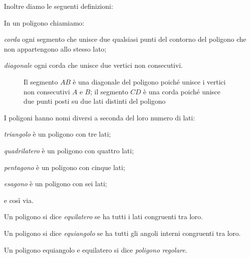 Inoltre diamo le seguenti definizioni:
\begin{definizione}
In un poligono chiamiamo:
\begin{itemize*}
\item \emph{corda} ogni segmento che unisce due qualsiasi punti del 
contorno del poligono che non appartengono allo stesso lato;
\item \emph{diagonale} ogni corda che unisce due vertici non 
consecutivi.
\end{itemize*}
\end{definizione}


\begin{inaccessibleblock}
 \begin{figure}[htb]
\centering
\caption{Il segmento \(AB\) è una diagonale del poligono poiché unisce 
i vertici non consecutivi \(A\) e \(B\); il segmento \(CD\) è una corda 
poiché unisce due punti posti su due lati distinti del poligono}
\end{figure}
\end{inaccessibleblock}

I poligoni hanno nomi diversi a seconda del loro numero di lati:
\begin{itemize*}
\item \emph{triangolo} è un poligono con tre lati;
\item \emph{quadrilatero} è un poligono con quattro lati;
\item \emph{pentagono} è un poligono con cinque lati;
\item \emph{esagono} è un poligono con sei lati;
\item e così via.
\end{itemize*}

\begin{definizione}
Un poligono si dice \emph{equilatero} se ha tutti i lati congruenti 
tra loro.
\end{definizione}

\begin{definizione}
Un poligono si dice \emph{equiangolo} se ha tutti gli angoli interni 
congruenti tra loro.
\end{definizione}

\begin{definizione}
Un poligono equiangolo e equilatero si dice \emph{poligono regolare}.
\end{definizione}

\ovalbox{\risolvii \ref{ese:1.125}, \ref{ese:1.126}, \ref{ese:1.127}, 
\ref{ese:1.128}, \ref{ese:1.129}, \ref{ese:1.130}, \ref{ese:1.131}, 
\ref{ese:1.132}, \ref{ese:1.133}, \ref{ese:1.134}}



